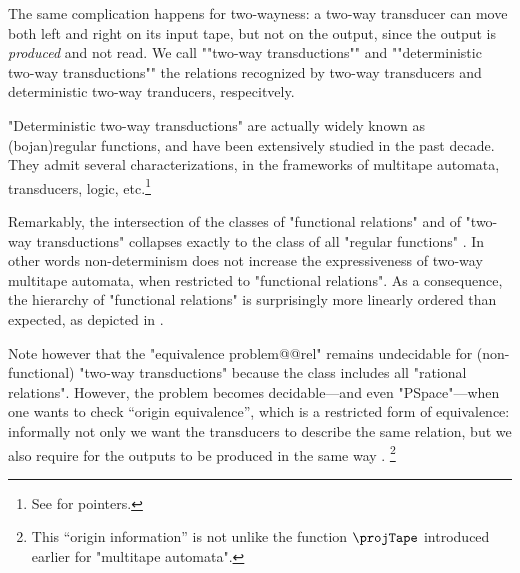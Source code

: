 The same complication happens for two-wayness: a two-way transducer can
move both left and right on its input tape, but not on the output,
since the output is \emph{produced} and not read.
We call \AP""two-way transductions"" and ""deterministic two-way transductions""
the relations recognized by two-way transducers and deterministic two-way tranducers, respecitvely.

"Deterministic two-way transductions" are actually widely 
known as \reintro(bojan){regular functions}, and have been extensively studied in the past
decade. They admit several characterizations, in the frameworks of multitape automata, transducers, logic, etc.\footnote{See \cite[4th~Paragraph]{Bojanczyk2022Transducers} for pointers.}

Remarkably, the intersection of the classes of "functional relations" and of "two-way transductions"
collapses exactly to the class of all "regular functions" \cite[Theorem 22, p.~243]{EngelfrietHoogeboom2001transduction}.
In other words non-determinism does not increase the expressiveness of two-way multitape automata, when restricted to "functional relations".
As a consequence, the hierarchy of "functional relations" is surprisingly more
linearly ordered than expected, as depicted in .

Note however that the "equivalence problem@@rel" remains undecidable for (non-functional)
"two-way transductions" because the class includes all "rational relations".
However, the problem becomes decidable---and even "PSpace"---when one wants to
check ``origin equivalence'', which is a restricted form of equivalence:
informally not only we want the transducers to describe the same relation, but
we also require for the outputs to be produced in the same way \cite[Theorem~1]{BoseMuschollPuppisPenelle2018OriginEquivalence}.%
\footnote{This ``origin information'' is not unlike the function
$\projTape$ introduced earlier for "multitape automata".}

